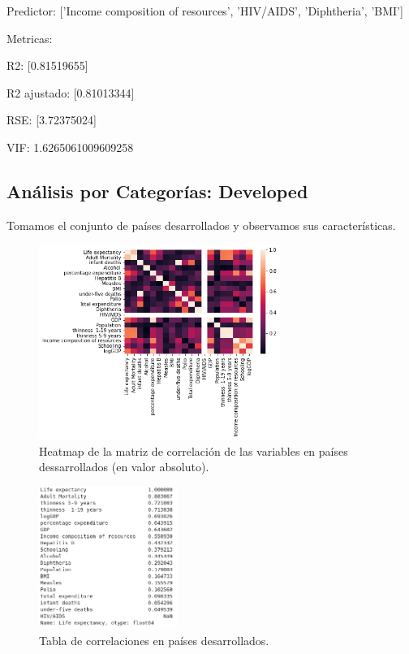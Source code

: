 Predictor:
['Income composition of resources', 'HIV/AIDS', 'Diphtheria', 'BMI']

Metricas:

R2: [0.81519655]

R2 ajustado: [0.81013344]

RSE: [3.72375024]

VIF: 1.6265061009609258

\subsection{Análisis por Categorías: Developed}

Tomamos el conjunto de países desarrollados y observamos sus características. 

 \begin{figure}[H]
	\centering
	\includegraphics[width=0.7\textwidth]{img/heatmap_corr_developed.png}
	\caption{Heatmap de la matriz de correlación de las variables en países dessarrollados (en valor absoluto).}
	\label{heatmap_developed}
\end{figure}

 \begin{figure}[H]
	\centering
	\includegraphics[width=0.4\textwidth]{img/tabla_developed.png}
	\caption{Tabla de correlaciones en países desarrollados.}
	\label{tabla_developed}
\end{figure}


